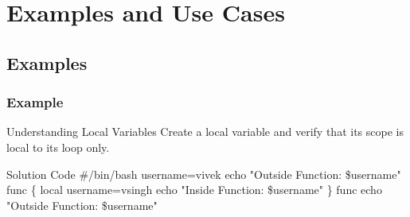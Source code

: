 \documentclass{beamer}
\begin{document}
\section{Examples and Use Cases}
\subsection{Examples}

\begin{frame}\frametitle{ Example }
\begin{block}{Understanding Local Variables}
Create a local variable and verify that its scope is local to its loop only.
\end{block}
\pause
\begin{exampleblock}{ Solution Code }
\#\!/bin/bash \newline
username=vivek \newline
echo "Outside Function: \$username" \newline
func\(\) \{ \newline
local username=vsingh \newline
echo "Inside Function: \$username" \} \newline
func \newline
echo "Outside Function: \$username"
\end{exampleblock}
\end{frame}


\end{document}
